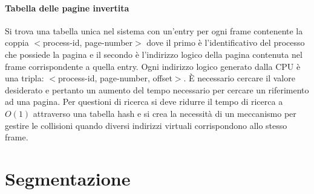 \paragraph{Tabella delle pagine invertita}
Si trova una tabella unica nel sistema con un'entry per ogni frame contenente la coppia $<$process-id, page-number$>$ dove il primo \`e l'identificativo del processo che possiede la
pagina e il secondo \`e l'indirizzo logico della pagina contenuta nel frame corrispondente a quella entry. Ogni indirizzo logico generato dalla CPU \`e una tripla: $<$process-id, 
page-number, offset$>$. \`E necessario cercare il valore desiderato e pertanto un aumento del tempo necessario per cercare un riferimento ad una pagina. Per questioni di ricerca si
deve ridurre il tempo di ricerca a $O(1)$ attraverso una tabella hash e si crea la necessit\`a di un meccanismo per gestire le collisioni quando diversi indirizzi virtuali corrispondono
allo stesso frame. 
\section{Segmentazione}

